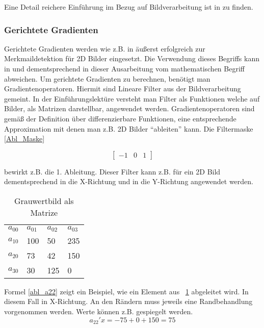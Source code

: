 Eine Detail reichere Einführung im Bezug auf Bildverarbeitung ist in \cite{Priese15} zu finden.

\subsubsection{Gerichtete Gradienten}
Gerichtete Gradienten werden wie z.B. in \cite{dalal2005histograms} äußerst erfolgreich zur Merkmaildetektion für 2D Bilder eingesetzt. Die Verwendung dieses Begriffs kann in \cite{scherer2010histograms} und dementsprechend in dieser Ausarbeitung vom mathematischen Begriff abweichen.
\newline
Um gerichtete Gradienten zu berechnen, benötigt man Gradientenoperatoren. Hiermit sind Lineare Filter aus der Bildverarbeitung gemeint. In der Einführungslektüre \cite{Priese15} versteht man Filter als Funktionen welche auf Bilder, als Matrizen darstellbar, angewendet werden. Gradientenoperatoren sind gemäß der Definition über differenzierbare Funktionen, eine entsprechende Approximation mit denen man z.B. 2D Bilder "`ableiten"' kann. Die Filtermaske \ref{Abl_Maske} 

\begin{equation}
\label{Abl_Maske}
\begin{bmatrix}
-1 & 0 & 1
\end{bmatrix}
\end{equation}

bewirkt z.B. die 1. Ableitung. Dieser Filter kann z.B. für ein 2D Bild dementsprechend in die X-Richtung und in die Y-Richtung angewendet werden. 

\begin{table}[]
	\centering
	\caption{Grauwertbild als Matrize}
	\label{GrauwertMat}
	\begin{tabular}{llll}
		$a_{00}$ & $a_{01}$ & $a_{02}$ & $a_{03}$ \\
		$a_{10}$ & 100    & 50     & 235     \\
		$a_{20}$ & 73     & 42     & 150      \\
		$a_{30}$ & 30     & 125    & 0                     
	\end{tabular}
\end{table}

Formel \ref{abl_a22} zeigt ein Beispiel, wie ein Element aus \tablename~\ref{GrauwertMat} abgeleitet wird. In diesem Fall in X-Richtung. An den Rändern muss jeweils eine Randbehandlung vorgenommen werden. Werte können z.B. gespiegelt werden.
\begin{equation}
\label{abl_a22}
a_{22}'x = -75 + 0 +150 = 75
\end{equation}


